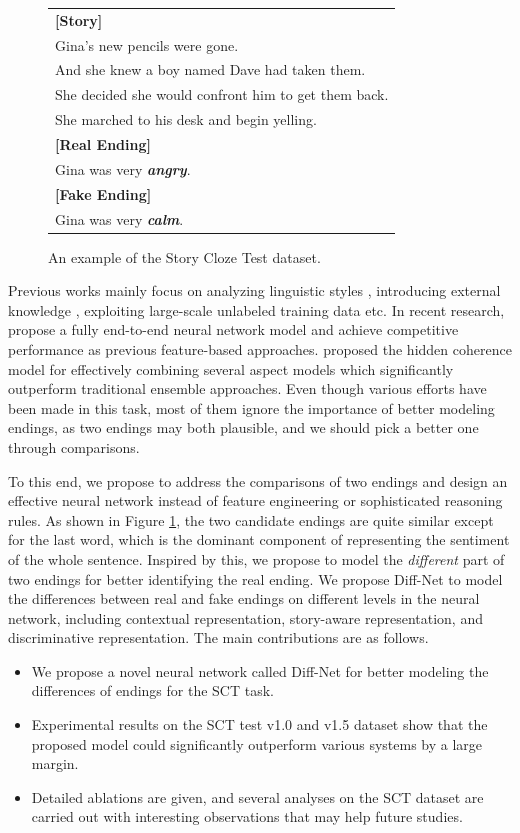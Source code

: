 \documentclass[letterpaper]{article} %
\begin{document}
\begin{figure}[tbp]
\centering
\begin{tabular}{l}
\toprule
{\bf [Story]} \\
Gina's new pencils were gone. \\
And she knew a boy named Dave had taken them. \\
She decided she would confront him to get them back. \\
She marched to his desk and begin yelling. \\
\midrule
{\bf [Real Ending]} \\
Gina was very {\bf \em angry}. \\
{\bf [Fake Ending]} \\
Gina was very {\bf \em calm}. \\
\bottomrule
\end{tabular}
\caption{\label{sct-example} An example of the Story Cloze Test dataset.}
\end{figure}

Previous works mainly focus on analyzing linguistic styles \cite{schwartz-etal-2017}, introducing external knowledge \cite{lin-etal-2017}, exploiting large-scale unlabeled training data \cite{bingning-etal-2017} etc.
In recent research, \citeauthor{cai-etal-2017}  propose a fully end-to-end neural network model and achieve competitive performance as previous feature-based approaches.
\citeauthor{chaturvedi-etal-2017}  proposed the hidden coherence model for effectively combining several aspect models which significantly outperform traditional ensemble approaches.
Even though various efforts have been made in this task, most of them ignore the importance of better modeling endings, as two endings may both plausible, and we should pick a better one through comparisons.

To this end, we propose to address the comparisons of two endings and design an effective neural network instead of feature engineering or sophisticated reasoning rules.
As shown in Figure \ref{sct-example}, the two candidate endings are quite similar except for the last word, which is the dominant component of representing the sentiment of the whole sentence. Inspired by this, we propose to model the {\em different} part of two endings for better identifying the real ending.
We propose Diff-Net to model the differences between real and fake endings on different levels in the neural network, including contextual representation, story-aware  representation, and discriminative representation.
The main contributions are as follows.
\begin{itemize}[leftmargin=*]
\item We propose a novel neural network called Diff-Net for better modeling the differences of endings for the SCT task.
\item Experimental results on the SCT test v1.0 and v1.5 dataset show that the proposed model could significantly outperform various systems by a large margin.
\item Detailed ablations are given, and several analyses on the SCT dataset are carried out with interesting observations that may help future studies.
\end{itemize}
\end{document}
